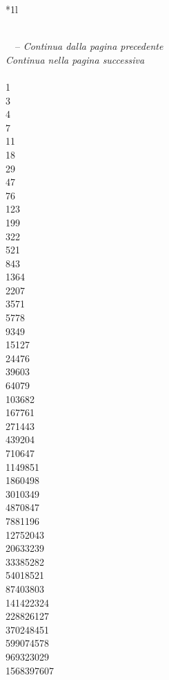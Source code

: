 \begin{longtable}{*{1}{l}}\toprule
\caption{Numeri di Lucas}\\
\midrule
\endfirsthead
{} {\tablename\ \thetable\ -- \textit{Continua dalla pagina precedente}} \\
\toprule
\endhead
\bottomrule
{} {\textit{Continua nella pagina successiva}} \\
\endfoot
{}\\
1\\
3\\
4\\
7\\
11\\
18\\
29\\
47\\
76\\
123\\
199\\
322\\
521\\
843\\
1364\\
2207\\
3571\\
5778\\
9349\\
15127\\
24476\\
39603\\
64079\\
103682\\
167761\\
271443\\
439204\\
710647\\
1149851\\
1860498\\
3010349\\
4870847\\
7881196\\
12752043\\
20633239\\
33385282\\
54018521\\
87403803\\
141422324\\
228826127\\
370248451\\
599074578\\
969323029\\
1568397607\\

\end{longtable}
